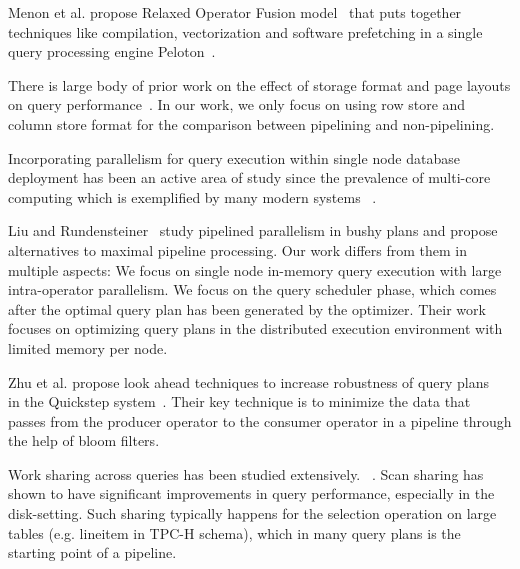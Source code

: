 Menon et al. propose Relaxed Operator Fusion model~\cite{rof} that puts together techniques like compilation, vectorization and software prefetching in a single query processing engine Peloton~\cite{pelotondb}. 

There is large body of prior work on the effect of storage format and page layouts on query performance~\cite{quickstep-storage, DBLP:journals/vldb/AilamakiDH02, DBLP:conf/vldb/HankinsP03, DBLP:journals/pvldb/GrundKPZCM10, DBLP:conf/sigmod/AbadiMH08}.
In our work, we only focus on using row store and column store format for the comparison between pipelining and non-pipelining. 

Incorporating parallelism for query execution within single node database deployment has been an active area of study since the prevalence of multi-core computing which is exemplified by many modern systems ~\cite{quickstep-system, morsel, vectorwise, hyrise-website}. 

Liu and Rundensteiner~\cite{DBLP:conf/vldb/LiuR05} study pipelined parallelism in bushy plans and propose alternatives to maximal pipeline processing. 
Our work differs from them in multiple aspects: We focus on single node in-memory query execution with large intra-operator parallelism. 
We focus on the query scheduler phase, which comes after the optimal query plan has been generated by the optimizer.
Their work focuses on optimizing query plans in the distributed execution environment with limited memory per node.

Zhu et al. propose look ahead techniques to increase robustness of query plans~\cite{DBLP:journals/pvldb/ZhuPSP17} in the Quickstep system~\cite{quickstep-system}.
Their key technique is to minimize the data that passes from the producer operator to the consumer operator in a pipeline through the help of bloom filters.

Work sharing across queries has been studied extensively. ~\cite{DBLP:conf/sigmod/HarizopoulosSA05, DBLP:conf/vldb/ZukowskiHNB07}.
Scan sharing has shown to have significant improvements in query performance, especially in the disk-setting.
Such sharing typically happens for the selection operation on large tables (e.g. lineitem in TPC-H schema), which in many query plans is the starting point of a pipeline. 

